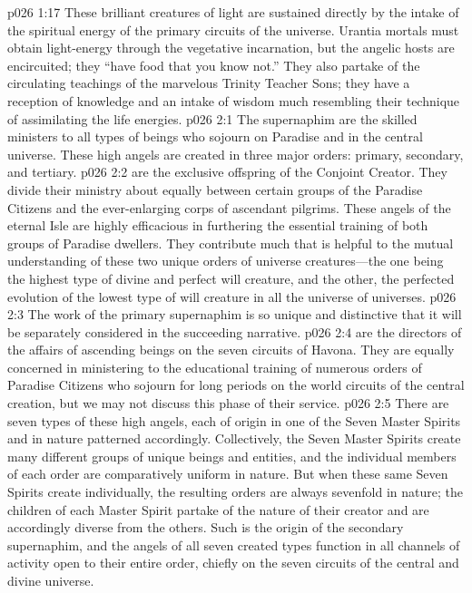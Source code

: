 \vs p026 1:17 These brilliant creatures of light are sustained directly by the intake of the spiritual energy of the primary circuits of the universe. Urantia mortals must obtain light\hyp{}energy through the vegetative incarnation, but the angelic hosts are encircuited; they “have food that you know not.” They also partake of the circulating teachings of the marvelous Trinity Teacher Sons; they have a reception of knowledge and an intake of wisdom much resembling their technique of assimilating the life energies.
\vs p026 2:1 The supernaphim are the skilled ministers to all types of beings who sojourn on Paradise and in the central universe. These high angels are created in three major orders: primary, secondary, and tertiary.
\pc \vs p026 2:2  are the exclusive offspring of the Conjoint Creator. They divide their ministry about equally between certain groups of the Paradise Citizens and the ever\hyp{}enlarging corps of ascendant pilgrims. These angels of the eternal Isle are highly efficacious in furthering the essential training of both groups of Paradise dwellers. They contribute much that is helpful to the mutual understanding of these two unique orders of universe creatures---the one being the highest type of divine and perfect will creature, and the other, the perfected evolution of the lowest type of will creature in all the universe of universes.
\pc \vs p026 2:3 The work of the primary supernaphim is so unique and distinctive that it will be separately considered in the succeeding narrative.
\pc \vs p026 2:4  are the directors of the affairs of ascending beings on the seven circuits of Havona. They are equally concerned in ministering to the educational training of numerous orders of Paradise Citizens who sojourn for long periods on the world circuits of the central creation, but we may not discuss this phase of their service.
\pc \vs p026 2:5 There are seven types of these high angels, each of origin in one of the Seven Master Spirits and in nature patterned accordingly. Collectively, the Seven Master Spirits create many different groups of unique beings and entities, and the individual members of each order are comparatively uniform in nature. But when these same Seven Spirits create individually, the resulting orders are always sevenfold in nature; the children of each Master Spirit partake of the nature of their creator and are accordingly diverse from the others. Such is the origin of the secondary supernaphim, and the angels of all seven created types function in all channels of activity open to their entire order, chiefly on the seven circuits of the central and divine universe.
